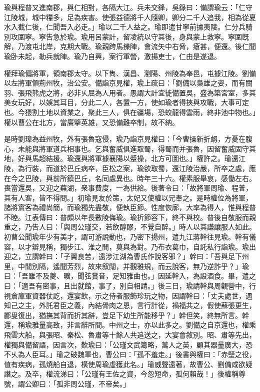 \begin{pinyinscope}
瑜與程普又進南郡，與仁相對，各隔大江。兵未交鋒，吳錄曰：備謂瑜云：「仁守江陵城，城中糧多，足為疾害。使張益德將千人隨卿，卿分二千人追我，相為從夏水入截仁後，仁聞吾入必走。」瑜以二千人益之。瑜即遣甘寧前據夷陵。仁分兵騎別攻圍寧。寧告急於瑜。瑜用呂蒙計，留凌統以守其後，身與蒙上救寧。寧圍旣解，乃渡屯北岸，克期大戰。瑜親跨馬擽陣，會流矢中右脅，瘡甚，便還。後仁聞瑜卧未起，勒兵就陣。瑜乃自興，案行軍營，激揚吏士，仁由是遂退。

權拜瑜偏將軍，領南郡太守。以下雋、漢昌、瀏陽、州陵為奉邑，屯據江陵。劉備以左將軍領荊州牧，治公安。備詣京見權，瑜上疏曰：「劉備以梟雄之姿，而有關羽、張飛熊虎之將，必非乆屈為人用者。愚謂大計宜徙備置吳，盛為築宮室，多其美女玩好，以娛其耳目，分此二人，各置一方，使如瑜者得挾與攻戰，大事可定也。今猥割土地以資業之，聚此三人，俱在疆場，恐蛟龍得雲雨，終非池中物也。」權以曹公在北方，當廣擥英雄，又恐備難卒制，故不納。

是時劉璋為益州牧，外有張魯寇侵，瑜乃詣京見權曰：「今曹操新折衂，方憂在腹心，未能與將軍道兵相事也。乞與奮威俱進取蜀，得蜀而并張魯，因留奮威固守其地，好與馬超結援。瑜還與將軍據襄陽以蹙操，北方可圖也。」權許之。瑜還江陵，為行裝，而道於巴丘病卒，臣松之案，瑜欲取蜀，還江陵治嚴，所卒之處，應在今之巴陵，與前所鎮巴丘，名同處異也。時年三十六。權素服舉哀，感慟左右。喪當還吳，又迎之蕪湖，衆事費度，一為供給。後著令曰：「故將軍周瑜、程普，其有人客，皆不得問。」初瑜見友於策，太妃又使權以兄奉之。是時權位為將軍，諸將賔客為禮尚簡，而瑜獨先盡敬，便執臣節。性度恢廓，大率為得人，惟與程普不睦。江表傳曰：普頗以年長數陵侮瑜。瑜折節容下，終不與校。普後自敬服而親重之，乃告人曰：「與周公瑾交，若飲醇醪，不覺自醉。」時人以其謙讓服人如此。初曹公聞瑜年少有美才，謂可游說動也，乃密下揚州，遣九江蔣幹往見瑜。幹有儀容，以才辯見稱，獨步江、淮之閒，莫與為對。乃布衣葛巾，自託私行詣瑜。瑜出迎之，立謂幹曰：「子翼良苦，遠涉江湖為曹氏作說客邪？」幹曰：「吾與足下州里，中閒別隔，遙聞芳烈，故來叙闊，并觀雅規，而云說客，無乃逆詐乎？」瑜曰：「吾雖不及夔、曠，聞弦賞音，足知雅曲也。」因延幹入，為設酒食。畢，遣之曰：「適吾有密事，且出就館，事了，別自相請。」後三日，瑜請幹與周觀營中，行視倉庫軍資器仗訖，還宴飲，示之侍者服飾珍玩之物，因謂幹曰：「丈夫處世，遇知己之主，外託君臣之義，內結骨肉之恩，言行計從，禍福共之，假使蘇張更生，酈叟復出，猶撫其背而折其辭，豈足下幼生所能移乎？」幹但笑，終無所言。幹還，稱瑜雅量高致，非言辭所間。中州之士，亦以此多之。劉備之自京還也，權乘飛雲大船，與張昭、秦松、魯肅等十餘人共追送之，大宴會敘別。昭、肅等先出，權獨與備留語，因言次，歎瑜曰：「公瑾文武籌略，萬人之英，顧其器量廣大，恐不乆為人臣耳。」瑜之破魏軍也，曹公曰：「孤不羞走。」後書與權曰：「赤壁之役，值有疾病，孤燒船自退，橫使周瑜虛獲此名。」瑜威聲遠著，故曹公、劉備咸欲疑譖之。及卒，權流涕曰：「公瑾有王佐之資，今忽短命，孤何賴哉！」後權稱尊號，謂公卿曰：「孤非周公瑾，不帝矣。」


\end{pinyinscope}
